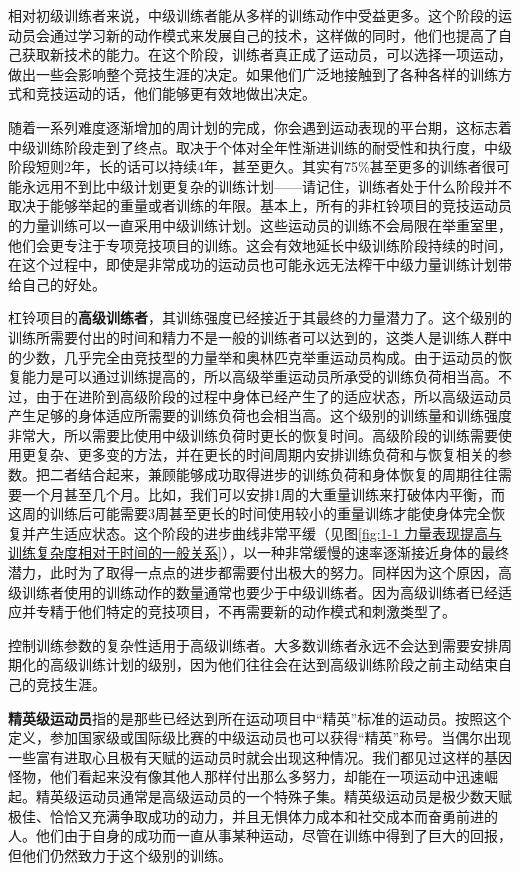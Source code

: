 相对初级训练者来说，中级训练者能从多样的训练动作中受益更多。这个阶段的运动员会通过学习新的动作模式来发展自己的技术，这样做的同时，他们也提高了自己获取新技术的能力。在这个阶段，训练者真正成了运动员，可以选择一项运动，做出一些会影响整个竞技生涯的决定。如果他们广泛地接触到了各种各样的训练方式和竞技运动的话，他们能够更有效地做出决定。

随着一系列难度逐渐增加的周计划的完成，你会遇到运动表现的平台期，这标志着中级训练阶段走到了终点。取决于个体对全年性渐进训练的耐受性和执行度，中级阶段短则2年，长的话可以持续4年，甚至更久。其实有75\%甚至更多的训练者很可能永远用不到比中级计划更复杂的训练计划——请记住，训练者处于什么阶段并不取决于能够举起的重量或者训练的年限。基本上，所有的非杠铃项目的竞技运动员的力量训练可以一直采用中级训练计划。这些运动员的训练不会局限在举重室里，他们会更专注于专项竞技项目的训练。这会有效地延长中级训练阶段持续的时间，在这个过程中，即使是非常成功的运动员也可能永远无法榨干中级力量训练计划带给自己的好处。

杠铃项目的\textbf{高级训练者}，其训练强度已经接近于其最终的力量潜力了。这个级别的训练所需要付出的时间和精力不是一般的训练者可以达到的，这类人是训练人群中的少数，几乎完全由竞技型的力量举和奥林匹克举重运动员构成。由于运动员的恢复能力是可以通过训练提高的，所以高级举重运动员所承受的训练负荷相当高。不过，由于在进阶到高级阶段的过程中身体已经产生了的适应状态，所以高级运动员产生足够的身体适应所需要的训练负荷也会相当高。这个级别的训练量和训练强度非常大，所以需要比使用中级训练负荷时更长的恢复时间。高级阶段的训练需要使用更复杂、更多变的方法，并在更长的时间周期内安排训练负荷和与恢复相关的参数。把二者结合起来，兼顾能够成功取得进步的训练负荷和身体恢复的周期往往需要一个月甚至几个月。比如，我们可以安排1周的大重量训练来打破体内平衡，而这周的训练后可能需要3周甚至更长的时间使用较小的重量训练才能使身体完全恢复并产生适应状态。这个阶段的进步曲线非常平缓（见图\ref{fig:1-1 力量表现提高与训练复杂度相对于时间的一般关系}），以一种非常缓慢的速率逐渐接近身体的最终潜力，此时为了取得一点点的进步都需要付出极大的努力。同样因为这个原因，高级训练者使用的训练动作的数量通常也要少于中级训练者。因为高级训练者已经适应并专精于他们特定的竞技项目，不再需要新的动作模式和刺激类型了。

控制训练参数的复杂性适用于高级训练者。大多数训练者永远不会达到需要安排周期化的高级训练计划的级别，因为他们往往会在达到高级训练阶段之前主动结束自己的竞技生涯。

\textbf{精英级运动员}指的是那些已经达到所在运动项目中“精英”标准的运动员。按照这个定义，参加国家级或国际级比赛的中级运动员也可以获得“精英”称号。当偶尔出现一些富有进取心且极有天赋的运动员时就会出现这种情况。我们都见过这样的基因怪物，他们看起来没有像其他人那样付出那么多努力，却能在一项运动中迅速崛起。精英级运动员通常是高级运动员的一个特殊子集。精英级运动员是极少数天赋极佳、恰恰又充满争取成功的动力，并且无惧体力成本和社交成本而奋勇前进的人。他们由于自身的成功而一直从事某种运动，尽管在训练中得到了巨大的回报，但他们仍然致力于这个级别的训练。

